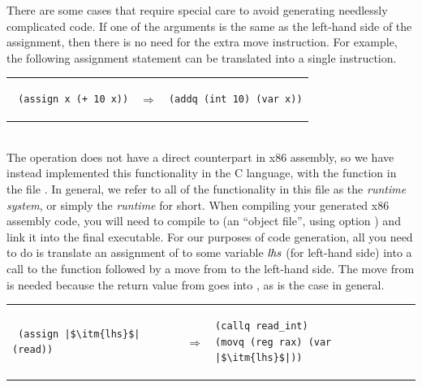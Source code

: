 \documentclass[11pt]{book}
\begin{document}
There are some cases that require special care to avoid generating
needlessly complicated code. If one of the arguments is the same as
the left-hand side of the assignment, then there is no need for the
extra move instruction.  For example, the following assignment
statement can be translated into a single  instruction.\\
\begin{tabular}{lll}
\begin{minipage}{0.4\textwidth}
\begin{lstlisting}
 (assign x (+ 10 x))
\end{lstlisting}
\end{minipage}
&
$\Rightarrow$
&
\begin{minipage}{0.4\textwidth}
\begin{lstlisting}
(addq (int 10) (var x))
\end{lstlisting}
\end{minipage}
\end{tabular} \\

The  operation does not have a direct counterpart in x86
assembly, so we have instead implemented this functionality in the C
language, with the function  in the file
. In general, we refer to all of the functionality in
this file as the \emph{runtime system}, or simply the \emph{runtime}
for short. When compiling your generated x86 assembly code, you
will need to compile  to  (an ``object
file'', using  option ) and link it into the final
executable. For our purposes of code generation, all you need to do is
translate an assignment of  to some variable $\mathit{lhs}$
(for left-hand side) into a call to the  function
followed by a move from  to the left-hand side.  The move
from  is needed because the return value from
 goes into , as is the case in general.  \\
\begin{tabular}{lll}
\begin{minipage}{0.4\textwidth}
\begin{lstlisting}
 (assign |$\itm{lhs}$| (read))
\end{lstlisting}
\end{minipage}
&
$\Rightarrow$
&
\begin{minipage}{0.4\textwidth}
\begin{lstlisting}
(callq read_int)
(movq (reg rax) (var |$\itm{lhs}$|))
\end{lstlisting}
\end{minipage}
\end{tabular} \\
\end{document}
